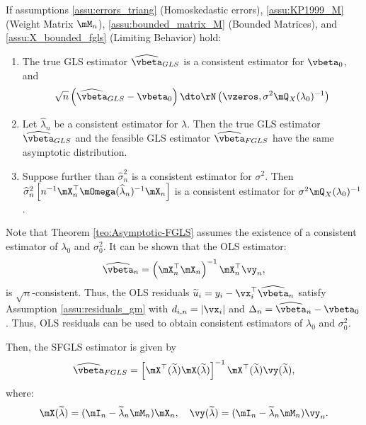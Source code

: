 \begin{theorem}\label{teo:Asymptotic-FGLS}
  If assumptions \ref{assu:errors_triang} (Homoskedastic errors), \ref{assu:KP1999_M} (Weight Matrix $\mM_n$), \ref{assu:bounded_matrix_M} (Bounded Matrices), and \ref{assu:X_bounded_fgls} (Limiting Behavior) hold: 
  \begin{enumerate}
    \item The true GLS estimator $\widehat{\vbeta}_{GLS}$ is a consistent estimator for $\vbeta_0$, and
    \begin{equation*}
      \sqrt{n}\left(\widehat{\vbeta}_{GLS} - \vbeta_0\right)\dto \rN\left(\vzeros, \sigma^2 \mQ_X(\lambda_0)^{-1}\right)
    \end{equation*}
    
    \item Let $\widehat{\lambda}_n$ be a consistent estimator for $\lambda$. Then the true GLS estimator $\widehat{\vbeta}_{GLS}$ and the feasible GLS estimator $\widehat{\vbeta}_{FGLS}$ have the same asymptotic distribution.
    \item Suppose further than $\widehat{\sigma}^2_n$ is a consistent estimator for $\sigma^2$. Then $\widehat{\sigma}^2_n\left[n^{-1}\mX^\top_n\mOmega(\widehat{\lambda}_n)^{-1}\mX_n\right]$ is a consistent estimator for $\sigma^2 \mQ_X(\lambda_0)^{-1}$.
  \end{enumerate}
\end{theorem}

Note that Theorem \ref{teo:Asymptotic-FGLS} assumes the existence of a consistent estimator of $\lambda_0$ and $\sigma^2_0$. It can be shown that the OLS estimator:
\begin{equation*}
\widehat{\vbeta}_n = \left(\mX^\top_n\mX_n\right)^{-1}\mX^\top_n\vy_n, 
\end{equation*}
%
is $\sqrt{n}$-consistent. Thus, the OLS residuals $\widetilde{u}_i = y_i - \vx_i^\top\widehat{\vbeta}_n$ satisfy Assumption \ref{assu:residuals_gm} with $d_{i, n} = \left|\vx_i\right|$ and $\Delta_n = \widehat{\vbeta}_n -\vbeta_0$. Thus, OLS residuals can be used to obtain consistent estimators of $\lambda_0$ and $\sigma^2_0$.

Then, the SFGLS estimator is given by
\begin{equation*}
  \widehat{\vbeta}_{FGLS} = \left[\mX^\top(\widetilde{\lambda})\mX(\widetilde{\lambda})\right]^{-1}\mX^\top(\widetilde{\lambda})\vy(\widetilde{\lambda}),
\end{equation*}
%
where:
\begin{equation*}
  \mX(\widetilde{\lambda})  = (\mI_n-\widetilde{\lambda}_n\mM_n)\mX_n, \quad \vy(\widetilde{\lambda})  = (\mI_n-\widetilde{\lambda}_n\mM_n)\vy_n.
\end{equation*}

